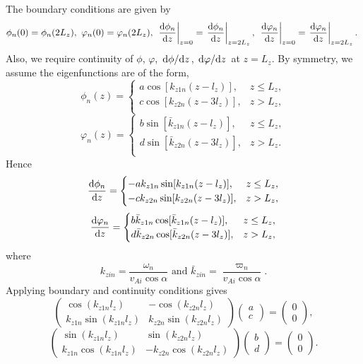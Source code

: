 \documentclass{article}
\begin{document}
The boundary conditions are given by 
\[\phi_n(0)=\phi_n(2L_z),\ 
\varphi_n(0)=\varphi_n(2L_z),\ 
\left.\dv{\phi_n}{z}\right|_{z=0}=\left.\dv{\phi_n}{z}\right|_{z=2L_z},\ 
\left.\dv{\varphi_n}{z}\right|_{z=0}=\left.\dv{\varphi_n}{z}\right|_{z=2L_z}.\ \]
Also, we require continuity of $\phi$, $\varphi$, $\dv*{\phi}{z}$, $\dv*{\varphi}{z}$ at $z=L_z$. By symmetry, we assume the eigenfunctions are of the form,
\[\phi_n(z)=\begin{cases}
a\cos[k_{z1n} (z-l_z)], & z \le L_z, \\
c\cos[k_{z2n} (z-3l_z)], & z > L_z, \\
\end{cases}\]
\[\varphi_n(z)=\begin{cases}
b\sin[\bar{k}_{z1n} (z-l_z)], & z \le L_z, \\
d\sin[\bar{k}_{z2n} (z-3l_z)], & z > L_z. \\
\end{cases}\]
Hence
\[\dv{\phi_n}{z}=\begin{cases}
-ak_{z1n}\sin[k_{z1n} (z-l_z)], & z \le L_z, \\
-ck_{z2n}\sin[k_{z2n} (z-3l_z)], & z > L_z, \\
\end{cases}\]
\[\dv{\varphi_n}{z}=\begin{cases}
b\bar{k}_{z1n}\cos[\bar{k}_{z1n} (z-l_z)], & z \le L_z, \\
d\bar{k}_{z2n}\cos[\bar{k}_{z2n} (z-3l_z)], & z > L_z, \\
\end{cases}\]
where 
\[k_{zin}=\frac{\omega_n}{v_{Ai}\cos\alpha} \text{ and } \bar{k}_{zin}=\frac{\varpi_n}{v_{Ai}\cos\alpha}.\]
Applying boundary and continuity conditions gives
\[\begin{pmatrix}
\cos(k_{z1n}l_z) & -\cos(k_{z2n}l_z) \\
k_{z1n}\sin(k_{z1n}l_z) & k_{z2n}\sin(k_{z2n}l_z)
\end{pmatrix}
\begin{pmatrix}
a \\
c
\end{pmatrix}
=
\begin{pmatrix}
0 \\
0
\end{pmatrix},\]
\[\begin{pmatrix}
\sin(k_{z1n}l_z) & \sin(k_{z2n}l_z) \\
k_{z1n}\cos(k_{z1n}l_z) & -k_{z2n}\cos(k_{z2n}l_z)
\end{pmatrix}
\begin{pmatrix}
b \\
d
\end{pmatrix}
=
\begin{pmatrix}
0 \\
0
\end{pmatrix}.\]
\end{document}
